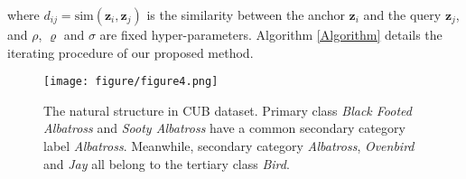 \documentclass[lettersize,journal]{IEEEtran}
\begin{document}
where $d_{ij} = \text{sim} (\mathbf{z}_i , \mathbf{z}_j) $ is the similarity between the anchor $\mathbf{z}_i$ and the query $\mathbf{z}_j$, and $\rho$, $\varrho$ and $\sigma$ are fixed hyper-parameters. Algorithm \ref{Algorithm} details the iterating procedure of our proposed method.

\begin{figure*}[t]
	\centering
	\texttt{[image: figure/figure4.png]}
	\caption{The natural structure in CUB dataset. Primary  class \textit{Black Footed Albatross} and \textit{Sooty Albatross} have a common secondary category label \textit{Albatross}. Meanwhile, secondary category \textit{Albatross}, \textit{Ovenbird} and \textit{Jay} all belong to the  tertiary class \textit{Bird}.} 
	\label{CUB}
\end{figure*}
\end{document}
